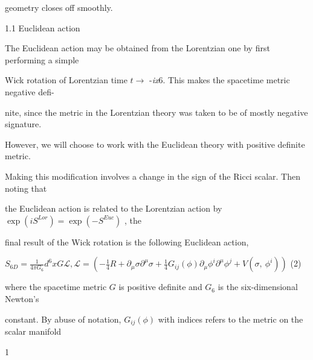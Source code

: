 \documentclass[a4paper,12pt]{article}
\begin{document}
geometry closes off smoothly.

1.1 Euclidean action

The Euclidean action may be obtained from the Lorentzian one by first performing a simple

Wick rotation of Lorentzian time $ t\rightarrow$ -{\it ix}6. This makes the spacetime metric negative defi-

nite, since the metric in the Lorentzian theory was taken to be of mostly negative signature.

However, we will choose to work with the Euclidean theory with positive definite metric.

Making this modification involves a change in the sign of the Ricci scalar. Then noting that

the Euclidean action is related to the Lorentzian action by $\exp(iS^{Lor}) =\exp(-S^{Euc})$ , the

final result of the Wick rotation is the following Euclidean action,

$S_{6D}=\displaystyle \frac{1}{4\pi G_{6}} d^{6}x G\mathcal{L}, \mathcal{L}= (-\displaystyle \frac{1}{4}R+\partial_{\mu}\sigma\partial^{\mu}\sigma+\frac{1}{4}G_{ij}(\phi)\partial_{\mu}\phi^{i}\partial^{\mu}\phi^{j}+V(\sigma,\ \phi^{i}))$ (2)

where the spacetime metric $G$ is positive definite and $G_{6}$ is the six-dimensional Newton's

constant. By abuse of notation, $G_{ij}(\phi)$ with indices refers to the metric on the scalar manifold

1
\end{document}
